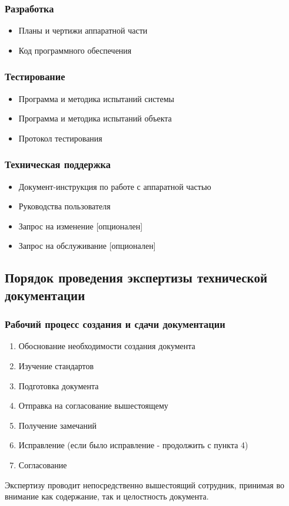 \documentclass[16pt,a4paper]{article}
\begin{document}
\subsubsection{Разработка}
\begin{itemize}
    \item Планы и чертижи аппаратной части
    \item Код программного обеспечения
\end{itemize}
\subsubsection{Тестирование}
\begin{itemize}
    \item Программа и методика испытаний системы
    \item Программа и методика испытаний объекта
    \item Протокол тестирования
\end{itemize}
\subsubsection{Техническая поддержка}
\begin{itemize}
    \item Документ-инструкция по работе с аппаратной частью
    \item Руководства пользователя
    \item Запрос на изменение [опционален]
    \item Запрос на обслуживание [опционален]
\end{itemize}
\subsection{Порядок проведения экспертизы технической документации}
\subsubsection{Рабочий процесс создания и сдачи документации}
\begin{enumerate}
    \item Обоснование необходимости создания документа
    \item Изучение стандартов
    \item Подготовка документа
    \item Отправка на согласование вышестоящему
    \item Получение замечаний
    \item Исправление (если было исправление - продолжить с пункта 4)
    \item Согласование
\end{enumerate}
Экспертизу проводит непосредственно вышестоящий сотрудник, принимая во внимание как содержание, так и целостность документа.
\end{document}
